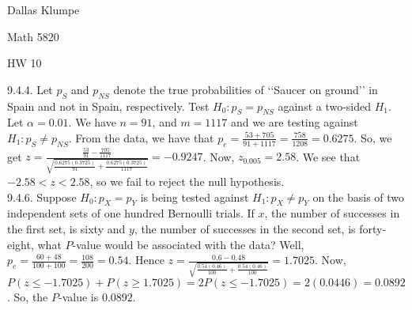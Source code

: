 \documentclass[12pt]{article}
\begin{document}
\noindent Dallas Klumpe

\noindent Math 5820

\noindent HW 10

9.4.4. Let $p_S$ and $p_{NS}$ denote the true probabilities of ‘‘Saucer on ground’’ in Spain and not in Spain, respectively. Test $H_0:p_S=p_{NS}$ against a two-sided $H_1$. Let $\alpha=0.01$.
We have $n=91$, and $m=1117$ and we are testing against $H_1:p_S\neq p_{NS}$. From the data, we have that $p_e=\frac{53+705}{91+1117}=\frac{758}{1208}=0.6275$. So, we get $z=\frac{\frac{53}{91}-\frac{705}{1117}}{\sqrt{\frac{0.6275(0.3725)}{91}+\frac{0.6275(0.3725)}{1117}}}=-0.9247$. Now, $z_{0.005}=2.58$. We see that $-2.58<z<2.58$, so we fail to reject the null hypothesis.\\[20pt]

9.4.6. Suppose $H_0:p_X=p_Y$ is being tested against $H_1:p_X \neq p_Y$ on the basis of two independent sets of one hundred Bernoulli trials. If $x$, the number of successes in the first set, is sixty and $y$, the number of successes in the second set, is forty-eight, what $P$-value would be associated with the data?
Well, $p_e=\frac{60+48}{100+100}=\frac{108}{200}=0.54$. Hence $z=\frac{0.6-0.48}{\sqrt{\frac{0.54(0.46)}{100}+\frac{0.54(0.46)}{100}}}=1.7025$. Now, $P(z\leq-1.7025)+P(z\geq1.7025)=2P(z\leq-1.7025)=2(0.0446)=0.0892$. So, the $P$-value is $0.0892$.
\end{document}
